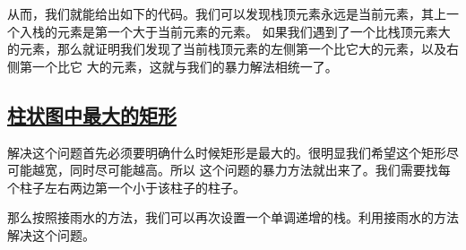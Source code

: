 \documentclass[../../main.tex]{subfiles}
\begin{document}
从而，我们就能给出如下的代码。我们可以发现栈顶元素永远是当前元素，其上一个入栈的元素是第一个大于当前元素的元素。
如果我们遇到了一个比栈顶元素大的元素，那么就证明我们发现了当前栈顶元素的左侧第一个比它大的元素，以及右侧第一个比它
大的元素，这就与我们的暴力解法相统一了。



\subsection{\href{https://leetcode-cn.com/problems/largest-rectangle-in-histogram/}{柱状图中最大的矩形}}

解决这个问题首先必须要明确什么时候矩形是最大的。很明显我们希望这个矩形尽可能越宽，同时尽可能越高。所以
这个问题的暴力方法就出来了。我们需要找每个柱子左右两边第一个小于该柱子的柱子。

那么按照接雨水的方法，我们可以再次设置一个单调递增的栈。利用接雨水的方法解决这个问题。


\end{document}
